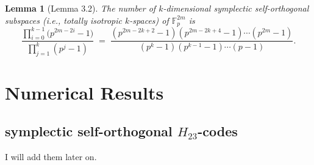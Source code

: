 \documentclass[11pt,a4paper]{article}
\newtheorem{lemma}[theorem]{Lemma}
\theoremstyle{definition}
\numberwithin{equation}{section}
\begin{document}
\begin{lemma}[Lemma 3.2]
The number of \(k\)-dimensional symplectic self-orthogonal subspaces (i.e., totally isotropic \(k\)-spaces) of \(\mathbb{F}_p^{2m}\) is
\[
\frac{\prod_{i=0}^{k-1}\bigl(p^{2m-2i}-1\bigr)}
{\prod_{j=1}^k (p^j-1)}
\;=\;
\frac{(p^{2m-2k+2}-1)(p^{2m-2k+4}-1)\cdots(p^{2m}-1)}
{(p^k-1)(p^{k-1}-1)\cdots(p-1)}.
\]
\end{lemma}
\section{Numerical Results}\label{Numerical}
\subsection{symplectic self-orthogonal $H_{23}$-codes}
I will add them later on. 
\end{document}
